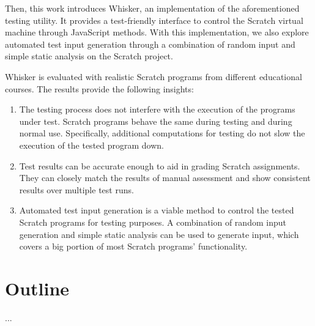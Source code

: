 Then, this work introduces Whisker, an implementation of the aforementioned testing utility.
It provides a test-friendly interface to control the Scratch virtual machine through JavaScript methods.
With this implementation, we also explore automated test input generation through a combination of random input and simple static analysis on the Scratch project.

Whisker is evaluated with realistic Scratch programs from different educational courses.
The results provide the following insights:

\begin{enumerate}[(1)]
    \item The testing process does not interfere with the execution of the programs under test.
        Scratch programs behave the same during testing and during normal use.
        Specifically, additional computations for testing do not slow the execution of the tested program down.
    \item Test results can be accurate enough to aid in grading Scratch assignments.
        They can closely match the results of manual assessment and show consistent results over multiple test runs.
    \item Automated test input generation is a viable method to control the tested Scratch programs for testing purposes.
        A combination of random input generation and simple static analysis can be used to generate input, which covers a big portion of most Scratch programs' functionality.
\end{enumerate}

\section{Outline}
...

%
